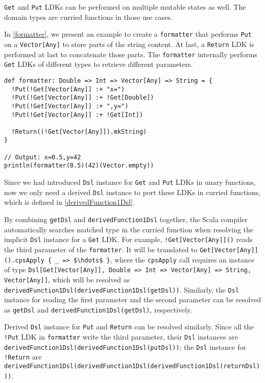 \lstinline{Get} and \lstinline{Put} LDKs can be performed on multiple mutable states as well. The domain types are curried functions in those use cases.

In \cref{formatter}, we present an example to create a \lstinline{formatter} that performs \lstinline{Put} on a \lstinline{Vector[Any]} to store parts of the string content. At last, a \lstinline{Return} LDK is performed at last to concatenate those parts. The \lstinline{formatter} internally performs \lstinline{Get} LDKs of different types to retrieve different parameters.

\begin{lstlisting}[caption={Using \lstinline{Get} and \lstinline{Put} in a curried function},label={formatter}]
def formatter: Double => Int => Vector[Any] => String = {
  !Put(!Get[Vector[Any]] :+ "x=")
  !Put(!Get[Vector[Any]] :+ !Get[Double])
  !Put(!Get[Vector[Any]] :+ ",y=")
  !Put(!Get[Vector[Any]] :+ !Get[Int])

  !Return((!Get[Vector[Any]]).mkString)
}

// Output: x=0.5,y=42
println(formatter(0.5)(42)(Vector.empty))
\end{lstlisting}

Since we had introduced \lstinline{Dsl} instance for \lstinline{Get} and \lstinline{Put} LDKs in unary functions, now we only need a derived \lstinline{Dsl} instance to port these LDKs in curried functions, which is defined in \cref{derivedFunction1Dsl}.

By combining \lstinline{getDsl} and \lstinline{derivedFunction1Dsl} together, the Scala compiler automatically searches matched type in the curried function when resolving the implicit \lstinline{Dsl} instance for a \lstinline{Get} LDK. For example, \lstinline{!Get[Vector[Any]]()} reads the third parameter of the \lstinline{formatter}. It will be translated to \lstinline[mathescape=true]|Get[Vector[Any]]().cpsApply { _ => $\hdots$ }|, where the \lstinline{cpsApply} call requires an instance of type \lstinline{Dsl[Get[Vector[Any]], Double => Int => Vector[Any] => String, Vector[Any]]}, which will be resolved as \lstinline{derivedFunction1Dsl(derivedFunction1Dsl(getDsl))}. Similarly, the \lstinline{Dsl} instance for reading the first parameter and the second parameter can be resolved as \lstinline{getDsl} and \lstinline{derivedFunction1Dsl(getDsl)}, respectively.

Derived \lstinline{Dsl} instance for \lstinline{Put} and \lstinline{Return} can be resolved similarly. Since all the \lstinline{!Put} LDK in \lstinline{formatter} write the third parameter, their \lstinline{Dsl} instances are \lstinline{derivedFunction1Dsl(derivedFunction1Dsl(putDsl))}; the \lstinline{Dsl} instance for \lstinline{!Return} are \lstinline{derivedFunction1Dsl(derivedFunction1Dsl(derivedFunction1Dsl(returnDsl)))}.


